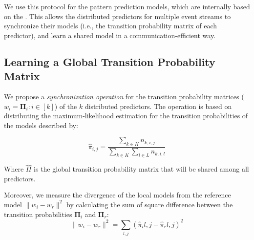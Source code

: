\par  We use this protocol for the pattern prediction models, which are internally based on the \pmcmr. This allows the distributed \pmcmr predictors for multiple event streams to synchronize their models (i.e., the transition probability matrix of each predictor), and learn a shared model in a communication-efficient way. 


\subsection*{Learning a Global Transition Probability Matrix}

\par We propose a \textit{synchronization operation} for the transition probability matrices ($w_i=\boldsymbol{\Pi}_i :i \in[k]$) of the $k$ distributed \pmcmr predictors. The operation is based on distributing the maximum-likelihood estimation \cite{anderson1957statistical} for the transition probabilities of the \pmcmr models described by:
 
\begin{equation}
\label{eq:dis_pi_estim}
\hat{\pi}_{i,j} = \frac{\sum_{k \in K} n_{k,i,j}}{\sum_{k \in K} \sum_{l \in L} n_{k,i,l}}
\end{equation}

Where $\hat{\Pi}$ is the global transition probability matrix that will be shared among all \pmcmr predictors. 
\par Moreover, we measure the divergence of the local models from the reference model  $\|w_i - w_r\|^2$ by calculating the sum of square difference between the transition probabilities  $\boldsymbol{\Pi}_i$ and  $\boldsymbol{\Pi}_r$:
\begin{equation*}
\label{eq:dis_pi_varinace}
\|w_i - w_r\|^2=\sum_{l,j} (\hat{\pi}_i{l,j} -\hat{\pi}_r{l,j})^2
\end{equation*}




